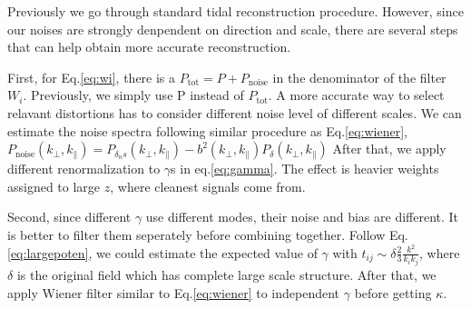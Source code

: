Previously we go through standard tidal reconstruction procedure. 
However, since our noises are strongly denpendent on direction and scale, 
there are several steps that can help obtain more accurate reconstruction.

First, for Eq.\ref{eq:wi}, there is a $P_{\mathrm{tot}}=P+P_\mathrm{noise}$ 
in the denominator of the filter $W_i$. 
Previously, we simply use P instead of $P_\mathrm{tot}$. 
A more accurate way to select relavant distortions has to consider different noise level of different scales. 
We can estimate the noise spectra following similar procedure as Eq.\ref{eq:wiener}, 
$P_\mathrm{noise}(k_\perp,k_\parallel)=P_{\delta_ns}(k_\perp,k_\parallel)-b^2(k_\perp,k_\parallel)P_\delta(k_\perp,k_\parallel)$
After that, we apply different renormalization to $\gamma$s in 
eq.\ref{eq:gamma}. 
The effect is heavier weights assigned to large $z$, where cleanest signals come from.

Second, since different $\gamma$ use different modes, 
their noise and bias are different. 
It is better to filter them seperately before combining together. 
Follow Eq.\ref{eq:largepoten}, we could estimate the expected value of $\gamma$ 
with 
$t_{ij}\sim \delta\frac{2}{3}\frac{k^2}{k_ik_j}$, 
where $\delta$ is the original field which has complete large scale structure. 
After that, we apply Wiener filter similar to Eq.\ref{eq:wiener} 
to independent $\gamma$ before getting $\kappa$. 


